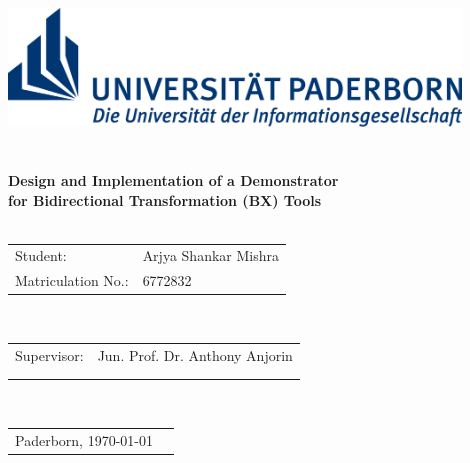\documentclass[%
				12pt,
				a4paper,
				twoside,
				titlepage,
				headsepline,
				numbers=noenddot,
				listof=totoc,
				index=totoc,
				bibliography=totoc]{scrartcl}
\theoremstyle{break}
\begin{document}
                

	\begin{titlepage}
	\thispagestyle{empty}
	\begin{center}

			\includegraphics[width=12cm]{figures/Logo_Uni_Paderborn}\\
                      
      		\vspace{3cm}
			{\LARGE  {}} \\
			\vspace{0,3cm}
			 \\
			\vspace{0,3cm}
			{\LARGE  \textbf{Design and Implementation of a Demonstrator\\ 
					for Bidirectional Transformation (BX) Tools}} \\ 
			\vspace{1cm}
			 \\
			\vspace{0,3cm}
			\begin{tabular}{l l}
				Student: & Arjya Shankar Mishra \\
				Matriculation No.: & 6772832\\
			\end{tabular}\\	
			\vspace{3cm}
			\begin{tabular}{l l}
				Supervisor: & Jun. Prof. Dr. Anthony Anjorin \\ \\ \\
			\end{tabular}\\ 
			\vspace{3cm}	
			\begin{tabular}{l l}
				Paderborn, \today \\
			\end{tabular}\\	
					
	\end{center}
	\end{titlepage}
	\clearpage

  
	\setcounter{page}{2}
	
  
  	
  	\newpage
  	
  	\newpage
  	
  	
	\clearpage
\end{document}
